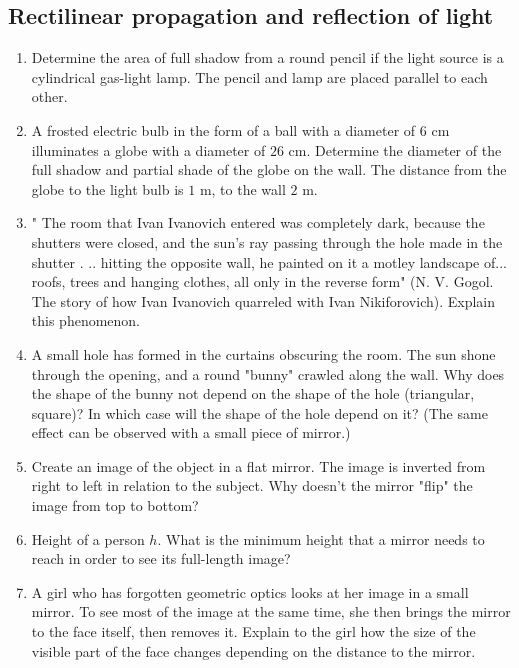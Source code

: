 \documentclass{article}
\begin{document}
\subsection{Rectilinear propagation and reflection of light}

\begin{enumerate}[label=13.1.\arabic*]


\item Determine the area of full shadow from a round pencil if the light source is a cylindrical gas-light lamp. The pencil and lamp are placed parallel to each other.

\item A frosted electric bulb in the form of a ball with a diameter of $6$ cm illuminates a globe with a diameter of $26$ cm. Determine the diameter of the full shadow and partial shade of the globe on the wall. The distance from the globe to the light bulb is $1$ m, to the wall $2$ m.

\item " The room that Ivan Ivanovich entered was completely dark, because the shutters were closed, and the sun's ray passing through the hole made in the shutter . .. hitting the opposite wall, he painted on it a motley landscape of... roofs, trees and hanging clothes, all only in the reverse form" (N. V. Gogol. The story of how Ivan Ivanovich quarreled with Ivan Nikiforovich). Explain this phenomenon.

\item A small hole has formed in the curtains obscuring the room. The sun shone through the opening, and a round "bunny" crawled along the wall. Why does the shape of the bunny not depend on the shape of the hole (triangular, square)? In which case will the shape of the hole depend on it? (The same effect can be observed with a small piece of mirror.)

\item Create an image of the object in a flat mirror. The image is inverted from right to left in relation to the subject. Why doesn't the mirror "flip" the image from top to bottom?

\item Height of a person $h$. What is the minimum height that a mirror needs to reach in order to see its full-length image?

\item A girl who has forgotten geometric optics looks at her image in a small mirror. To see most of the image at the same time, she then brings the mirror to the face itself, then removes it. Explain to the girl how the size of the visible part of the face changes depending on the distance to the mirror.


\end{enumerate}
\end{document}
